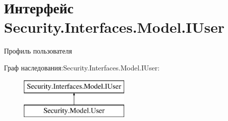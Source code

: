 \hypertarget{interface_security_1_1_interfaces_1_1_model_1_1_i_user}{}\section{Интерфейс Security.\+Interfaces.\+Model.\+I\+User}
\label{interface_security_1_1_interfaces_1_1_model_1_1_i_user}


Профиль пользователя  


Граф наследования\+:Security.\+Interfaces.\+Model.\+I\+User\+:\begin{figure}[H]
\begin{center}
\leavevmode
\includegraphics[height=2.000000cm]{dd/d53/interface_security_1_1_interfaces_1_1_model_1_1_i_user}
\end{center}
\end{figure}
